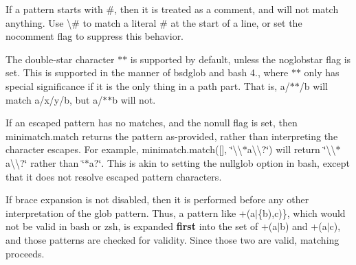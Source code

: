 If a pattern starts with {\ttfamily \#}, then it is treated as a comment, and will not match anything. Use {\ttfamily \textbackslash{}\#} to match a literal {\ttfamily \#} at the start of a line, or set the {\ttfamily nocomment} flag to suppress this behavior.

The double-\/star character {\ttfamily $\ast$$\ast$} is supported by default, unless the {\ttfamily noglobstar} flag is set. This is supported in the manner of bsdglob and bash 4., where {\ttfamily $\ast$$\ast$} only has special significance if it is the only thing in a path part. That is, {\ttfamily a/$\ast$$\ast$/b} will match {\ttfamily a/x/y/b}, but {\ttfamily a/$\ast$$\ast$b} will not.

If an escaped pattern has no matches, and the {\ttfamily nonull} flag is set, then minimatch.\+match returns the pattern as-\/provided, rather than interpreting the character escapes. For example, {\ttfamily minimatch.\+match(\mbox{[}\mbox{]}, \char`\"{}\textbackslash{}\textbackslash{}$\ast$a\textbackslash{}\textbackslash{}?\char`\"{})} will return {\ttfamily \char`\"{}\textbackslash{}\textbackslash{}$\ast$a\textbackslash{}\textbackslash{}?\char`\"{}} rather than {\ttfamily \char`\"{}$\ast$a?\char`\"{}}. This is akin to setting the {\ttfamily nullglob} option in bash, except that it does not resolve escaped pattern characters.

If brace expansion is not disabled, then it is performed before any other interpretation of the glob pattern. Thus, a pattern like {\ttfamily +(a$\vert$\{b),c)\}}, which would not be valid in bash or zsh, is expanded {\bfseries first} into the set of {\ttfamily +(a$\vert$b)} and {\ttfamily +(a$\vert$c)}, and those patterns are checked for validity. Since those two are valid, matching proceeds. 